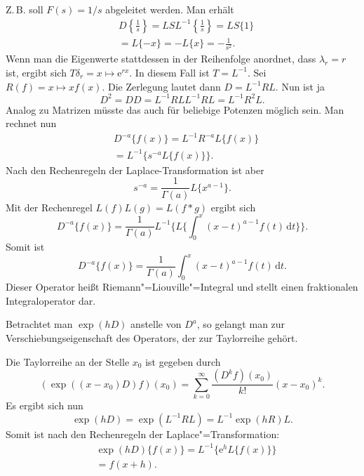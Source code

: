 \documentclass[a4paper,11pt,fleqn,twocolumn,twoside]{scrartcl}
\numberwithin{equation}{section}
\newcommand{\ee}{\mathrm e}
\begin{document}
Z.\,B. soll $F(s)=1/s$ abgeleitet werden. Man erhält%
\begin{equation}
\begin{split}
& D\left\{\frac{1}{s}\right\}
= LSL^{-1}\left\{\frac{1}{s}\right\} = LS\{1\}\\
&= L\{-x\} = -L\{x\} = -\frac{1}{s^2}.
\end{split}
\end{equation}
Wenn man die Eigenwerte stattdessen in der Reihenfolge anordnet,
dass $\lambda_r=r$ ist, ergibt sich
$T\delta_r=x\mapsto\ee^{rx}$. In diesem Fall ist $T=L^{-1}$.
Sei $R(f)=x\mapsto xf(x)$. Die Zerlegung lautet dann
$D=L^{-1}RL$. Nun ist ja
\begin{equation}
D^2 = DD = L^{-1}RLL^{-1}RL = L^{-1}R^2L.
\end{equation}
Analog zu Matrizen müsste das auch für beliebige Potenzen möglich
sein. Man rechnet nun
\begin{equation}
\begin{split}
& D^{-a}\{f(x)\} = L^{-1}R^{-a}L\{f(x)\}\\
&= L^{-1}\{s^{-a}L\{f(x)\}\}.
\end{split}
\end{equation}
Nach den Rechenregeln der Laplace-Transformation ist aber
\begin{equation}
s^{-a} = \frac{1}{\Gamma(a)}L\{x^{a-1}\}.
\end{equation}
Mit der Rechenregel $L(f)L(g) = L(f*g)$ ergibt sich
\[D^{-a}\{f(x)\}
= \frac{1}{\Gamma(a)}L^{-1}
\{L\{\int_0^x (x-t)^{a-1}f(t)\,\mathrm dt\}\}.\]
Somit ist
\begin{equation}
D^{-a}\{f(x)\}
= \frac{1}{\Gamma(a)}
\int_0^x (x-t)^{a-1}f(t)\,\mathrm dt.
\end{equation}
Dieser Operator heißt Riemann"=Liouville"=Integral und stellt
einen fraktionalen Integraloperator dar.

Betrachtet man $\exp(hD)$ anstelle von $D^a$, so gelangt man
zur Verschiebungseigenschaft des Operators, der zur
Taylorreihe gehört.

Die Taylorreihe an der Stelle $x_0$ ist gegeben durch
\[(\exp((x-x_0)D)f)(x_0)
= \sum_{k=0}^\infty \frac{(D^k f)(x_0)}{k!}(x-x_0)^k.\]
Es ergibt sich nun
\begin{equation}
\exp(hD) = \exp(L^{-1} R L) = L^{-1} \exp(hR) L.
\end{equation}
Somit ist nach den Rechenregeln der Laplace"=Transformation:
\begin{equation}
\begin{split}
& \exp(hD)\{f(x)\} = L^{-1}\{\ee^h L\{f(x)\}\}\\
& = f(x+h).
\end{split}
\end{equation}
\end{document}
